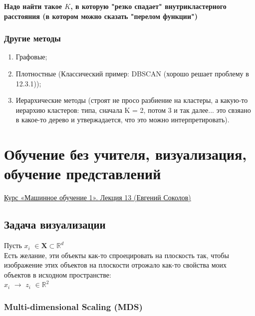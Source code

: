             \textbf{Надо найти такое $K$, в которую "резко спадает" внутрикластерного расстояния (в котором можно сказать "перелом функции")}


        \subsubsection{Другие методы}
            \begin{enumerate}
                \item Графовые;
                \item Плотностные (Классический пример: DBSCAN (хорошо решает проблему в 12.3.1));

                \item Иерархические методы (строят не просо разбиение на кластеры, а какую-то иерархию кластеров: типа, сначала K = 2, потом 3 и так далее... это свзяано в какое-то дерево и утвержадается, что это можно интерпретировать).
                
            \end{enumerate}



\newpage
\section{Обучение без учителя, визуализация, обучение представлений}

    \href{https://www.youtube.com/watch?v=SBZgycJWQc0&list=PLEqoHzpnmTfChItexxg2ZfxCsm-8QPsdS&index=15}{Курс «Машинное обучение 1». Лекция 13 (Евгений Соколов)}

    \subsection{Задача визуализации}

        Пусть $x_i$ $\in \mathbf{X} \subset \mathbb{R}^d$\\

        Есть желание, эти объекты как-то спроецировать на плоскость так, чтобы изображение этих объектов на плоскости отрожало как-то свойства моих объектов в исходном пространстве:\\

        $x_i$ $\to$ $z_i$ $\in \mathbb{R}^2$

        \subsubsection{Multi-dimensional Scaling (MDS)}

